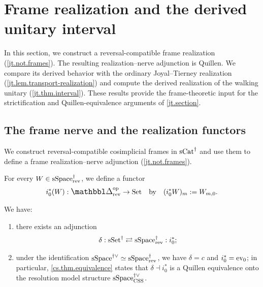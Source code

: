 \documentclass[a4paper,dvipdfmx,11pt]{amsart}
\begin{document}
\section{Frame realization and the derived unitary interval}\label{jt.frames-section}

In this section, we construct a reversal-compatible frame realization (\cref{jt.not.frames}).
The resulting realization--nerve adjunction is Quillen.
We compare its derived behavior with the ordinary Joyal--Tierney realization (\cref{jt.lem.transport-realization}) and compute the derived realization of the walking unitary (\cref{jt.thm.interval}).
These results provide the frame-theoretic input for the strictification and Quillen-equivalence arguments of \cref{jt.section}.

\subsection{The frame nerve and the realization functors}

We construct reversal-compatible cosimplicial frames in $\mathrm{sCat}^{\dag}$ and use them to define a frame realization--nerve adjunction (\cref{jt.not.frames}).

\begin{definition}
  For every $W \in \mathrm{sSpace}^{\dag}_{\mathrm{rev}}$, we define a functor 
  \begin{align}
    i_{0}^{*}(W) : \prism^{\myop}_{\rev} \to \Set
    \quad \text{by} \quad
    (i_{0}^{*}W)_m:=W_{m,0}.
  \end{align}
\end{definition}

\begin{lemma}\label{jt.lem.c-delta}
  We have:
  \begin{enumerate}
    \item there exists an adjunction 
    \begin{align}
      \delta : \mathrm{sSet}^{\dag} \rightleftarrows \mathrm{sSpace}^{\dag}_{\mathrm{rev}} : i_{0}^{*};
    \end{align}
    \item under the identification $\mathrm{sSpace}^{\dag\vee}\simeq\mathrm{sSpace}^{\dag}_{\mathrm{rev}}$, we have $\delta=c$ and $i_{0}^{*}=\mathrm{ev}_0$;
    in particular, \cref{cs.thm.equivalence} states that $\delta\dashv i_{0}^{*}$ is a Quillen equivalence onto the resolution model structure $\mathrm{sSpace}^{\dag\vee}_{\mathrm{CSS}}$.
  \end{enumerate}
\end{lemma}
\end{document}

